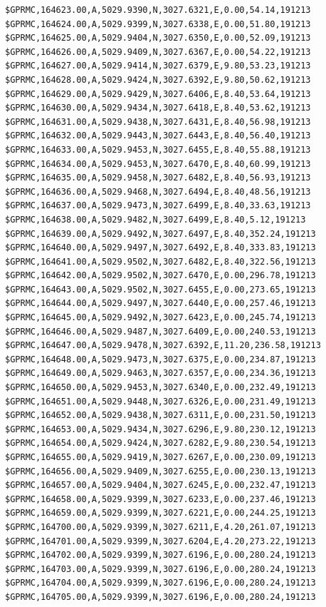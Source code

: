 \documentclass[simple,a4paper,14pt,ukrainian,utf8]{eskdtext}
\begin{document}
\begin{appendices}
\begin{small}
\begin{lstlisting}
$GPRMC,164623.00,A,5029.9390,N,3027.6321,E,0.00,54.14,191213
$GPRMC,164624.00,A,5029.9399,N,3027.6338,E,0.00,51.80,191213
$GPRMC,164625.00,A,5029.9404,N,3027.6350,E,0.00,52.09,191213
$GPRMC,164626.00,A,5029.9409,N,3027.6367,E,0.00,54.22,191213
$GPRMC,164627.00,A,5029.9414,N,3027.6379,E,9.80,53.23,191213
$GPRMC,164628.00,A,5029.9424,N,3027.6392,E,9.80,50.62,191213
$GPRMC,164629.00,A,5029.9429,N,3027.6406,E,8.40,53.64,191213
$GPRMC,164630.00,A,5029.9434,N,3027.6418,E,8.40,53.62,191213
$GPRMC,164631.00,A,5029.9438,N,3027.6431,E,8.40,56.98,191213
$GPRMC,164632.00,A,5029.9443,N,3027.6443,E,8.40,56.40,191213
$GPRMC,164633.00,A,5029.9453,N,3027.6455,E,8.40,55.88,191213
$GPRMC,164634.00,A,5029.9453,N,3027.6470,E,8.40,60.99,191213
$GPRMC,164635.00,A,5029.9458,N,3027.6482,E,8.40,56.93,191213
$GPRMC,164636.00,A,5029.9468,N,3027.6494,E,8.40,48.56,191213
$GPRMC,164637.00,A,5029.9473,N,3027.6499,E,8.40,33.63,191213
$GPRMC,164638.00,A,5029.9482,N,3027.6499,E,8.40,5.12,191213
$GPRMC,164639.00,A,5029.9492,N,3027.6497,E,8.40,352.24,191213
$GPRMC,164640.00,A,5029.9497,N,3027.6492,E,8.40,333.83,191213
$GPRMC,164641.00,A,5029.9502,N,3027.6482,E,8.40,322.56,191213
$GPRMC,164642.00,A,5029.9502,N,3027.6470,E,0.00,296.78,191213
$GPRMC,164643.00,A,5029.9502,N,3027.6455,E,0.00,273.65,191213
$GPRMC,164644.00,A,5029.9497,N,3027.6440,E,0.00,257.46,191213
$GPRMC,164645.00,A,5029.9492,N,3027.6423,E,0.00,245.74,191213
$GPRMC,164646.00,A,5029.9487,N,3027.6409,E,0.00,240.53,191213
$GPRMC,164647.00,A,5029.9478,N,3027.6392,E,11.20,236.58,191213
$GPRMC,164648.00,A,5029.9473,N,3027.6375,E,0.00,234.87,191213
$GPRMC,164649.00,A,5029.9463,N,3027.6357,E,0.00,234.36,191213
$GPRMC,164650.00,A,5029.9453,N,3027.6340,E,0.00,232.49,191213
$GPRMC,164651.00,A,5029.9448,N,3027.6326,E,0.00,231.49,191213
$GPRMC,164652.00,A,5029.9438,N,3027.6311,E,0.00,231.50,191213
$GPRMC,164653.00,A,5029.9434,N,3027.6296,E,9.80,230.12,191213
$GPRMC,164654.00,A,5029.9424,N,3027.6282,E,9.80,230.54,191213
$GPRMC,164655.00,A,5029.9419,N,3027.6267,E,0.00,230.09,191213
$GPRMC,164656.00,A,5029.9409,N,3027.6255,E,0.00,230.13,191213
$GPRMC,164657.00,A,5029.9404,N,3027.6245,E,0.00,232.47,191213
$GPRMC,164658.00,A,5029.9399,N,3027.6233,E,0.00,237.46,191213
$GPRMC,164659.00,A,5029.9399,N,3027.6221,E,0.00,244.25,191213
$GPRMC,164700.00,A,5029.9399,N,3027.6211,E,4.20,261.07,191213
$GPRMC,164701.00,A,5029.9399,N,3027.6204,E,4.20,273.22,191213
$GPRMC,164702.00,A,5029.9399,N,3027.6196,E,0.00,280.24,191213
$GPRMC,164703.00,A,5029.9399,N,3027.6196,E,0.00,280.24,191213
$GPRMC,164704.00,A,5029.9399,N,3027.6196,E,0.00,280.24,191213
$GPRMC,164705.00,A,5029.9399,N,3027.6196,E,0.00,280.24,191213

\end{lstlisting}
\end{small}
\end{appendices}
\end{document}
